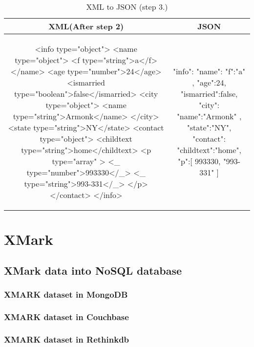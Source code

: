 	\begin{longtable}{c|c}
	\caption{XML to JSON (step 3.)}
	\label{tbl:xmljson-convert-3}\\
	\textbf{XML(After step 2)} & \textbf{JSON}\\
	\hline
\begin{minipage}{.55\textwidth}
\begin{fakeXML}
<info type="object">
  <name type="object">
    <f type="string">a</f>
  </name>
  <age type="number">24</age>
  <ismarried type="boolean">false</ismarried>
  <city type="object">
    <name type="string">Armonk</name>
  </city>
  <state type="string">NY</state>
  <contact type="object">
	<childtext type="string">home</childtext>
    <p  type="array" >
	   <_ type="number">993330</_>
	   <_ type="string">993-331</_>
    </p>
  </contact>
</info>
\end{fakeXML}	
\end{minipage} &
\begin{minipage}{.5\textwidth}
\begin{fakeJSON}
{
    "info":{
      "name":{
        "f":"a"
      },
      "age":24,
      "ismarried":false,
      "city":{
        "name":"Armonk"
      },
      "state":"NY",
      "contact":{
	   "childtext":"home",
        "p":[
          993330,
          "993-331"
        ]
      }
    }
}
\end{fakeJSON}
\end{minipage}\\
\end{longtable}
	
\section{XMark}\label{xmark}
			
		\subsection{XMark data into NoSQL database}\label{xmark-nosql}
			
			\subsubsection{XMARK dataset in MongoDB}\label{xmark-mongodb}
				
			\subsubsection{XMARK dataset in Couchbase}\label{xmark-couchbase}
				
			\subsubsection{XMARK dataset in Rethinkdb}\label{xmark-rethinkdb}
				
